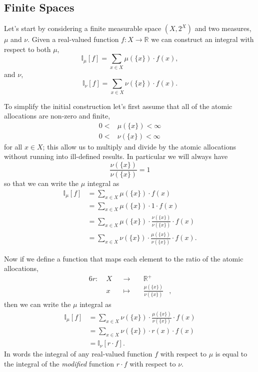 \documentclass[
  letterpaper,
  DIV=11,
  numbers=noendperiod]{scrartcl}
\begin{document}
\hypertarget{sec:finite_densities}{%
\subsection{Finite Spaces}\label{sec:finite_densities}}

Let's start by considering a finite measurable space \((X, 2^{X})\) and
two measures, \(\mu\) and \(\nu\). Given a real-valued function
\(f: X \rightarrow \mathbb{R}\) we can construct an integral with
respect to both \(\mu\), \[
\mathbb{I}_{\mu}[f] = \sum_{x \in X} \mu( \{ x \} ) \cdot f(x),
\] and \(\nu\), \[
\mathbb{I}_{\nu}[f] = \sum_{x \in X} \nu( \{ x \} ) \cdot f(x).
\]

To simplify the initial construction let's first assume that all of the
atomic allocations are non-zero and finite, \begin{align*}
0 < &\mu( \{ x \} ) < \infty
\\
0 < &\nu( \{ x \} ) < \infty
\end{align*} for all \(x \in X\); this allow us to multiply and divide
by the atomic allocations without running into ill-defined results. In
particular we will always have \[
\frac{ \nu( \{ x \} )}{ \nu( \{ x \} )} = 1
\] so that we can write the \(\mu\) integral as \begin{align*}
\mathbb{I}_{\mu}[f]
&=
\sum_{x \in X} \mu( \{ x \} ) \cdot f(x)
\\
&=
\sum_{x \in X} \mu( \{ x \} ) \cdot 1 \cdot f(x)
\\
&=
\sum_{x \in X} \mu( \{ x \} ) \cdot
\frac{ \nu( \{ x \} )}{ \nu( \{ x \} )} \cdot
f(x)
\\
&=
\sum_{x \in X} \nu( \{ x \} ) \cdot
\frac{ \mu( \{ x \} )}{ \nu( \{ x \} )} \cdot
f(x).
\end{align*}

Now if we define a function that maps each element to the ratio of the
atomic allocations, \begin{alignat*}{6}
r :\; & X & &\rightarrow& \; & \mathbb{R}^{+} &
\\
& x & &\mapsto& & \frac{ \mu( \{ x \} )}{ \nu( \{ x \} )} &,
\end{alignat*} then we can write the \(\mu\) integral as \begin{align*}
\mathbb{I}_{\mu}[f]
&=
\sum_{x \in X} \nu( \{ x \} ) \cdot
\frac{ \mu( \{ x \} )}{ \nu( \{ x \} )} \cdot f(x)
\\
&=
\sum_{x \in X} \nu( \{ x \} ) \cdot r(x) \cdot f(x)
\\
&=
\mathbb{I}_{\nu} [ r \cdot f ].
\end{align*} In words the integral of any real-valued function \(f\)
with respect to \(\mu\) is equal to the integral of the \emph{modified}
function \(r \cdot f\) with respect to \(\nu\).
\end{document}

